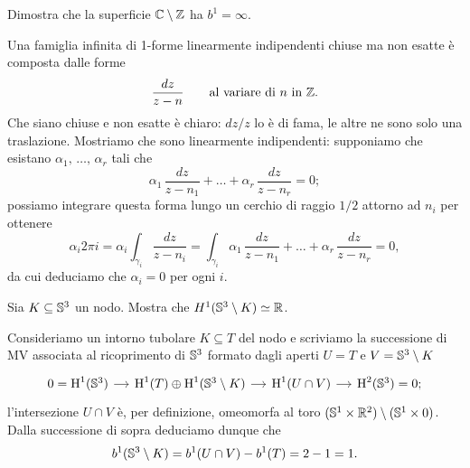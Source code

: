 \documentclass[a4paper]{article}
\begin{document}
\begin{ex}[7.6]{Dimostra che la superficie $ \C \setminus \Z $ ha $ b^1 = \infty $.}
	
	Una famiglia infinita di 1-forme linearmente indipendenti chiuse ma non esatte è composta dalle forme
	\[ \frac{dz}{z-n} \qquad \text{al variare di $ n $ in $ \Z $}. \]
	Che siano chiuse e non esatte è chiaro: $ dz/z $ lo è di fama, le altre ne sono solo una traslazione. Mostriamo che sono linearmente indipendenti: supponiamo che esistano $ \alpha_1,\,\dots, \,  \alpha_r $ tali che
	\[ \alpha_1\,\frac{dz}{z-n_1} + \dots + \alpha_r\,\frac{dz}{z-n_r} = 0;  \]
	possiamo integrare questa forma lungo un cerchio di raggio $ 1/2 $ attorno ad $ n_i $ per ottenere
	\[ \alpha_i 2\pi i = \alpha_i \int_{\gamma_i} \frac{dz}{z-n_i} = \int_{\gamma_i} \alpha_1\,\frac{dz}{z-n_1} + \dots + \alpha_r\,\frac{dz}{z-n_r} = 0, \]
	da cui deduciamo che $ \alpha_i = 0 $ per ogni $ i $.
\end{ex}

\begin{ex}[7.7]{Sia $ K \subseteq \S^3 $ un nodo. Mostra che $ H^1(\S^3 \setminus K) \simeq \R $.}
	
	Consideriamo un intorno tubolare $ K \subseteq T $ del nodo e scriviamo la successione di MV associata al ricoprimento di $ \S^3 $ formato dagli aperti $ U=T $ e $ V=\S^3\setminus K $
	\[ \begin{tikzcd}[column sep = small]
	0 = \HH^{1}(\S^3) \rar & \HH^{1}(T)\oplus \HH^{1}(\S^3\setminus K) \rar & \HH^{1}(U \cap V) \rar  & \HH^{2}(\S^3)=0;
	\end{tikzcd}  \]
	l'intersezione $ U \cap V $ è, per definizione, omeomorfa al toro $ (\S^1 \times \R^2) \setminus (\S^1 \times 0) $. Dalla successione di sopra deduciamo dunque che
	\[ b^1(\S^3\setminus K) = b^1(U \cap V) - b^1(T) = 2-1 = 1. \]
\end{ex}
\end{document}
